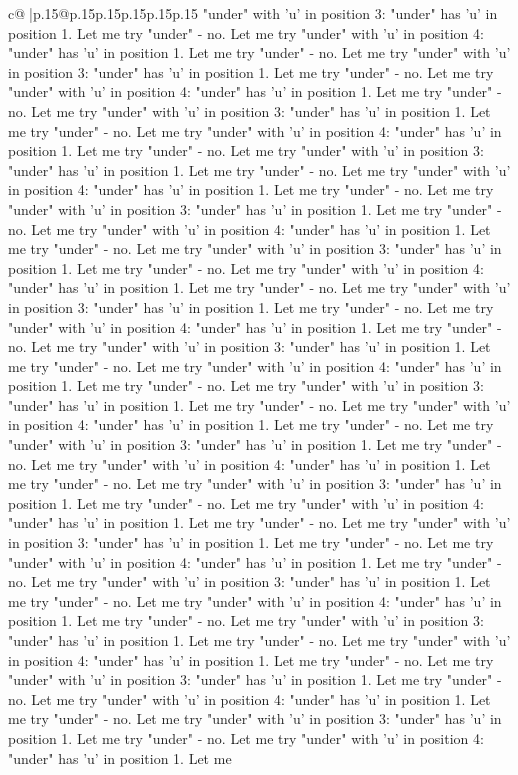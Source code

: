 \documentclass{article}
\begin{document}
{\begin{supertabular}{c@{$\;$}|p{.15\linewidth}@{}p{.15\linewidth}p{.15\linewidth}p{.15\linewidth}p{.15\linewidth}p{.15\linewidth}}
{{{"under" with 'u' in position 3: "under" has 'u' in position 1. Let me try "under" {-} no. Let me try "under" with 'u' in position 4: "under" has 'u' in position 1. Let me try "under" {-} no. Let me try "under" with 'u' in position 3: "under" has 'u' in position 1. Let me try "under" {-} no. Let me try "under" with 'u' in position 4: "under" has 'u' in position 1. Let me try "under" {-} no. Let me try "under" with 'u' in position 3: "under" has 'u' in position 1. Let me try "under" {-} no. Let me try "under" with 'u' in position 4: "under" has 'u' in position 1. Let me try "under" {-} no. Let me try "under" with 'u' in position 3: "under" has 'u' in position 1. Let me try "under" {-} no. Let me try "under" with 'u' in position 4: "under" has 'u' in position 1. Let me try "under" {-} no. Let me try "under" with 'u' in position 3: "under" has 'u' in position 1. Let me try "under" {-} no. Let me try "under" with 'u' in position 4: "under" has 'u' in position 1. Let me try "under" {-} no. Let me try "under" with 'u' in position 3: "under" has 'u' in position 1. Let me try "under" {-} no. Let me try "under" with 'u' in position 4: "under" has 'u' in position 1. Let me try "under" {-} no. Let me try "under" with 'u' in position 3: "under" has 'u' in position 1. Let me try "under" {-} no. Let me try "under" with 'u' in position 4: "under" has 'u' in position 1. Let me try "under" {-} no. Let me try "under" with 'u' in position 3: "under" has 'u' in position 1. Let me try "under" {-} no. Let me try "under" with 'u' in position 4: "under" has 'u' in position 1. Let me try "under" {-} no. Let me try "under" with 'u' in position 3: "under" has 'u' in position 1. Let me try "under" {-} no. Let me try "under" with 'u' in position 4: "under" has 'u' in position 1. Let me try "under" {-} no. Let me try "under" with 'u' in position 3: "under" has 'u' in position 1. Let me try "under" {-} no. Let me try "under" with 'u' in position 4: "under" has 'u' in position 1. Let me try "under" {-} no. Let me try "under" with 'u' in position 3: "under" has 'u' in position 1. Let me try "under" {-} no. Let me try "under" with 'u' in position 4: "under" has 'u' in position 1. Let me try "under" {-} no. Let me try "under" with 'u' in position 3: "under" has 'u' in position 1. Let me try "under" {-} no. Let me try "under" with 'u' in position 4: "under" has 'u' in position 1. Let me try "under" {-} no. Let me try "under" with 'u' in position 3: "under" has 'u' in position 1. Let me try "under" {-} no. Let me try "under" with 'u' in position 4: "under" has 'u' in position 1. Let me try "under" {-} no. Let me try "under" with 'u' in position 3: "under" has 'u' in position 1. Let me try "under" {-} no. Let me try "under" with 'u' in position 4: "under" has 'u' in position 1. Let me try "under" {-} no. Let me try "under" with 'u' in position 3: "under" has 'u' in position 1. Let me try "under" {-} no. Let me try "under" with 'u' in position 4: "under" has 'u' in position 1. Let me try "under" {-} no. Let me try "under" with 'u' in position 3: "under" has 'u' in position 1. Let me try "under" {-} no. Let me try "under" with 'u' in position 4: "under" has 'u' in position 1. Let me }}}
\end{supertabular}}
\end{document}
